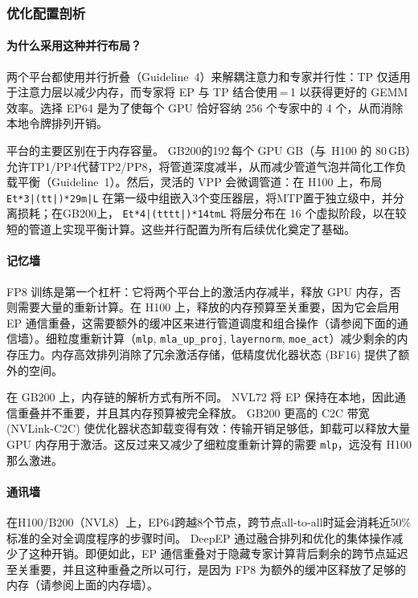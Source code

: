 \subsubsection{优化配置剖析}

\paragraph*{为什么采用这种并行布局？}
两个平台都使用并行折叠（Guideline~4）来解耦注意力和专家并行性：TP 仅适用于注意力层以减少内存，而专家将 EP 与 TP 结合使用\,=\,1 以获得更好的 GEMM 效率。选择 EP64 是为了使每个 GPU 恰好容纳 256 个专家中的 4 个，从而消除本地令牌排列开销。

平台的主要区别在于内存容量。 GB200的192\,每个 GPU GB（与\ H100 的 80\,GB）允许TP1/PP4代替TP2/PP8，将管道深度减半，从而减少管道气泡并简化工作负载平衡（Guideline~1）。然后，灵活的 VPP 会微调管道：在 H100 上，布局 \texttt{Et*3|(tt|)*29m|L} 在第一级中组嵌入3个变压器层，将MTP置于独立级中，并分离损耗；在GB200上， \texttt{Et*4|(tttt|)*14tmL} 将层分布在 16 个虚拟阶段，以在较短的管道上实现平衡计算。这些并行配置为所有后续优化奠定了基础。

\paragraph*{记忆墙}
FP8 训练是第一个杠杆：它将两个平台上的激活内存减半，释放 GPU 内存，否则需要大量的重新计算。在 H100 上，释放的内存预算至关重要，因为它会启用 EP 通信重叠，这需要额外的缓冲区来进行管道调度和组合操作（请参阅下面的通信墙）。细粒度重新计算（\texttt{mlp}, \texttt{mla\_up\_proj}, \texttt{layernorm}, \texttt{moe\_act}）减少剩余的内存压力。内存高效排列消除了冗余激活存储，低精度优化器状态 (BF16) 提供了额外的空间。

在 GB200 上，内存链的解析方式有所不同。 NVL72 将 EP 保持在本地，因此通信重叠并不重要，并且其内存预算被完全释放。 GB200 更高的 C2C 带宽 (NVLink-C2C) 使优化器状态卸载变得有效：传输开销足够低，卸载可以释放大量 GPU 内存用于激活。这反过来又减少了细粒度重新计算的需要 \texttt{mlp}，远没有 H100 那么激进。

\paragraph*{通讯墙}
在H100/B200（NVL8）上，EP64跨越8个节点，跨节点all-to-all时延会消耗近50\% 标准的全对全调度程序的步骤时间。 DeepEP 通过融合排列和优化的集体操作减少了这种开销。即便如此，EP 通信重叠对于隐藏专家计算背后剩余的跨节点延迟至关重要，并且这种重叠之所以可行，是因为 FP8 为额外的缓冲区释放了足够的内存（请参阅上面的内存墙）。


